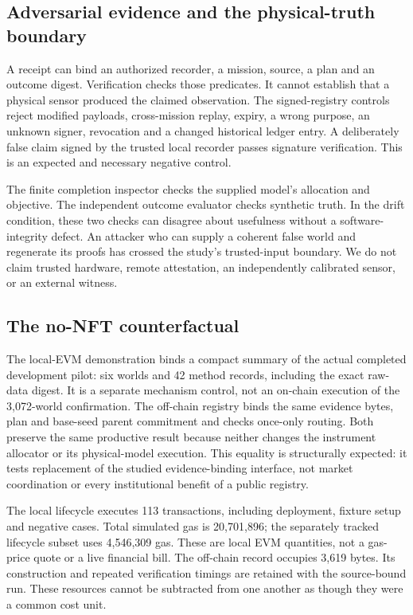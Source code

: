\subsection{Adversarial evidence and the physical-truth boundary}
A receipt can bind an authorized recorder, a mission, source, a plan and an outcome digest. Verification checks those predicates. It cannot establish that a physical sensor produced the claimed observation. The signed-registry controls reject modified payloads, cross-mission replay, expiry, a wrong purpose, an unknown signer, revocation and a changed historical ledger entry. A deliberately false claim signed by the trusted local recorder passes signature verification. This is an expected and necessary negative control.

The finite completion inspector checks the supplied model's allocation and objective. The independent outcome evaluator checks synthetic truth. In the drift condition, these two checks can disagree about usefulness without a software-integrity defect. An attacker who can supply a coherent false world and regenerate its proofs has crossed the study's trusted-input boundary. We do not claim trusted hardware, remote attestation, an independently calibrated sensor, or an external witness.

\subsection{The no-NFT counterfactual}
The local-EVM demonstration binds a compact summary of the actual completed development pilot: six worlds and 42 method records, including the exact raw-data digest. It is a separate mechanism control, not an on-chain execution of the 3,072-world confirmation. The off-chain registry binds the same evidence bytes, plan and base-seed parent commitment and checks once-only routing. Both preserve the same productive result because neither changes the instrument allocator or its physical-model execution. This equality is structurally expected: it tests replacement of the studied evidence-binding interface, not market coordination or every institutional benefit of a public registry.

The local lifecycle executes 113 transactions, including deployment, fixture setup and negative cases. Total simulated gas is 20,701,896; the separately tracked lifecycle subset uses 4,546,309 gas. These are local EVM quantities, not a gas-price quote or a live financial bill. The off-chain record occupies 3,619 bytes. Its construction and repeated verification timings are retained with the source-bound run. These resources cannot be subtracted from one another as though they were a common cost unit.

